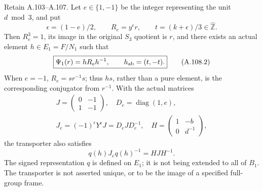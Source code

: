 Retain A.103--A.107. Let \(e\in\{1,-1\}\) be the integer representing
the unit \(d\bmod3\), and put
\[
 \epsilon=(1-e)/2,\qquad R_e=y^\epsilon r,\qquad
 t=(k+\epsilon)/3\in\widehat{\mathbb Z}.
 \tag{A.108.1}
\]
Then \(R_e^3=1\), its image in the original \(S_3\) quotient is \(r\),
and there exists an actual element \(h\in E_1=F/N_1\) such that
\[
 \boxed{\Psi_1(r)=hR_eh^{-1},\qquad h_{\rm ab}=(t,-t).}
 \tag{A.108.2}
\]
When \(e=-1\), \(R_e=sr^{-1}s\); thus \(hs\), rather than a pure
element, is the corresponding conjugator from \(r^{-1}\).
With the actual matrices
\[
 \begin{gathered}
 J=\begin{pmatrix}0&-1\\1&-1\end{pmatrix},\quad
 D_e=\operatorname{diag}(1,e),\\
 J_e=(-1)^\epsilon Y^\epsilon J=D_eJD_e^{-1},\quad
 H=\begin{pmatrix}1&-b\\0&d^{-1}\end{pmatrix},
 \end{gathered}
 \tag{A.108.3}
\]
the transporter also satisfies
\[
 q(h)J_eq(h)^{-1}=HJH^{-1}.
 \tag{A.108.4}
\]
The signed representation \(q\) is defined on \(E_1\); it is not
being extended to all of \(B_1\). The transporter is not asserted
unique, or to be the image of a specified full-group frame.

